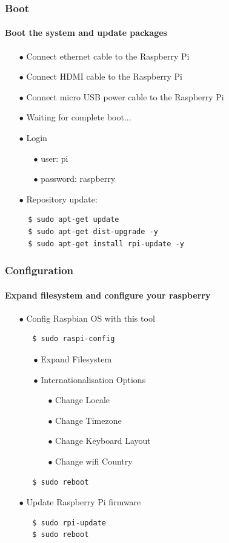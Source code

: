 \documentclass{beamer}
\begin{document}

\begin{frame}[fragile]
	\frametitle{\textbf{Boot}}
	\framesubtitle{\textbf{Boot the system and update packages}}

		\begin{itemize}
			\item[$\bullet$] Connect ethernet cable to the Raspberry Pi
			\item[$\bullet$] Connect HDMI cable to the Raspberry Pi
			\item[$\bullet$] Connect micro USB power cable to the Raspberry Pi
			\item[$\bullet$] Waiting for complete boot...
			\item[$\bullet$] Login
			\begin{itemize}
				\item[$\bullet$] user: pi
				\item[$\bullet$] password: raspberry
			\end{itemize}
			\item[$\bullet$] Repository update:
			\begin{lstlisting}
  $ sudo apt-get update
  $ sudo apt-get dist-upgrade -y
  $ sudo apt-get install rpi-update -y
			\end{lstlisting}
			\end{itemize}
\end{frame}


\begin{frame}[fragile]
	\frametitle{\textbf{Configuration}}
	\framesubtitle{\textbf{Expand filesystem and configure your raspberry}}
		\begin{itemize}
			\item[$\bullet$] Config Raspbian OS with this tool
			\begin{lstlisting}
   $ sudo raspi-config
			\end{lstlisting}
			\begin{itemize}
				\item[$\bullet$] Expand Filesystem
				\item[$\bullet$] Internationalisation Options
				\begin{itemize}
					\item[$\bullet$] Change Locale
					\item[$\bullet$] Change Timezone
					\item[$\bullet$] Change Keyboard Layout
					\item[$\bullet$] Change wifi Country
				\end{itemize}
			\end{itemize}
			\begin{lstlisting}
   $ sudo reboot
			\end{lstlisting}
			\item[$\bullet$] Update Raspberry Pi firmware
			\begin{lstlisting}
   $ sudo rpi-update
   $ sudo reboot
			\end{lstlisting}
		\end{itemize}
\end{frame}
\end{document}
